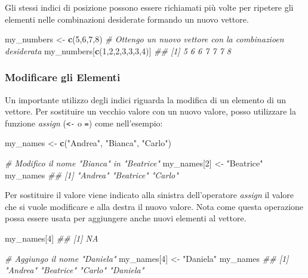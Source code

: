 \documentclass[
]{book}
\newenvironment{Shaded}{\begin{snugshade}}{\end{snugshade}}
\newcommand{\CommentTok}[1]{\textcolor[rgb]{0.56,0.35,0.01}{\textit{#1}}}
\newcommand{\DecValTok}[1]{\textcolor[rgb]{0.00,0.00,0.81}{#1}}
\newcommand{\KeywordTok}[1]{\textcolor[rgb]{0.13,0.29,0.53}{\textbf{#1}}}
\newcommand{\NormalTok}[1]{#1}
\newcommand{\StringTok}[1]{\textcolor[rgb]{0.31,0.60,0.02}{#1}}
\begin{document}
Gli stessi indici di posizione possono essere richiamati più volte per ripetere gli elementi nelle combinazioni desiderate formando un nuovo vettore.

\begin{Shaded}
\begin{Highlighting}[]
\NormalTok{my_numbers <-}\StringTok{ }\KeywordTok{c}\NormalTok{(}\DecValTok{5}\NormalTok{,}\DecValTok{6}\NormalTok{,}\DecValTok{7}\NormalTok{,}\DecValTok{8}\NormalTok{)}
\CommentTok{# Ottengo un nuovo vettore con la combinazioen desiderata}
\NormalTok{my_numbers[}\KeywordTok{c}\NormalTok{(}\DecValTok{1}\NormalTok{,}\DecValTok{2}\NormalTok{,}\DecValTok{2}\NormalTok{,}\DecValTok{3}\NormalTok{,}\DecValTok{3}\NormalTok{,}\DecValTok{3}\NormalTok{,}\DecValTok{4}\NormalTok{)]}
\CommentTok{## [1] 5 6 6 7 7 7 8}
\end{Highlighting}
\end{Shaded}

\hypertarget{modificare-gli-elementi}{%
\subsubsection*{Modificare gli Elementi}\label{modificare-gli-elementi}}

Un importante utilizzo degli indici riguarda la modifica di un elemento di un vettore. Per sostituire un vecchio valore con un nuovo valore, posso utilizzare la funzione \emph{assign} (\texttt{\textless{}-} o \texttt{=}) come nell'esempio:

\begin{Shaded}
\begin{Highlighting}[]
\NormalTok{my_names <-}\StringTok{ }\KeywordTok{c}\NormalTok{(}\StringTok{"Andrea"}\NormalTok{, }\StringTok{"Bianca"}\NormalTok{, }\StringTok{"Carlo"}\NormalTok{)}

\CommentTok{# Modifico il  nome "Bianca" in "Beatrice"}
\NormalTok{my_names[}\DecValTok{2}\NormalTok{] <-}\StringTok{ "Beatrice"}
\NormalTok{my_names}
\CommentTok{## [1] "Andrea"   "Beatrice" "Carlo"}
\end{Highlighting}
\end{Shaded}

Per sostituire il valore viene indicato alla sinistra dell'operatore \emph{assign} il valore che si vuole modificare e alla destra il nuovo valore. Nota come questa operazione possa essere usata per aggiungere anche nuovi elementi al vettore.

\begin{Shaded}
\begin{Highlighting}[]
\NormalTok{my_names[}\DecValTok{4}\NormalTok{]}
\CommentTok{## [1] NA}

\CommentTok{# Aggiungo il nome "Daniela"}
\NormalTok{my_names[}\DecValTok{4}\NormalTok{] <-}\StringTok{ "Daniela"}
\NormalTok{my_names}
\CommentTok{## [1] "Andrea"   "Beatrice" "Carlo"    "Daniela"}
\end{Highlighting}
\end{Shaded}
\end{document}
